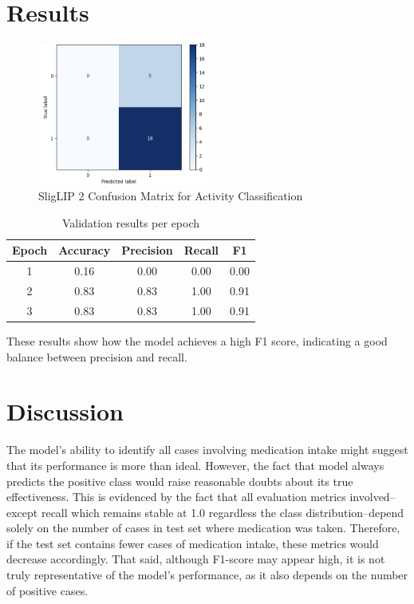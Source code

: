 \documentclass[a4paper,12pt]{article}
\begin{document}
\section{Results}
\begin{figure}[H]
    \centering
    \includegraphics[width=0.5\textwidth]{./images/test confusion matrix.png} %
    \caption{SligLIP 2 Confusion Matrix for Activity Classification}
    \label{fig:test-cm}
\end{figure}


\begin{table}[H]
    \centering
    \begin{tabular}{|c||c|c|c|c|}
        \hline
        Epoch & Accuracy & Precision & Recall & F1 \\
        \hline
        1 & 0.16 & 0.00 & 0.00 & 0.00 \\
        2 & 0.83 & 0.83 & 1.00 & 0.91 \\
        3 & 0.83 & 0.83 & 1.00 & 0.91 \\
        \hline
    \end{tabular}
    \caption{Validation results per epoch}
    \label{tab:val-results}
\end{table}


These results show how the model achieves a high F1 score, indicating a good balance between precision and recall. 

\section{Discussion}
The model's ability to identify all cases involving medication intake might suggest that its performance is more than ideal. 
However, the fact that model always predicts the positive class would raise reasonable doubts about its true effectiveness. 
This is evidenced by the fact that all evaluation metrics involved--except recall which remains stable at 1.0 regardless the
 class distribution--depend solely on the number of cases in test set where medication was taken. Therefore, if the test set 
 contains fewer cases of medication intake, these metrics would decrease accordingly. That said, although F1-score may appear high, 
 it is not truly representative of the model's performance, as it also depends on the number of positive cases.
\end{document}
